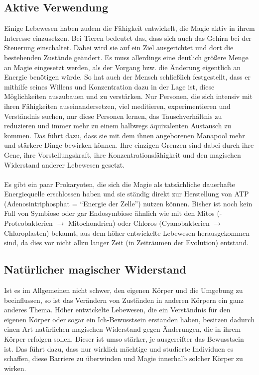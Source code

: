 \subsection{Aktive Verwendung}
Einige Lebewesen haben zudem die Fähigkeit entwickelt, die Magie aktiv in ihrem Interesse einzusetzen.
Bei Tieren bedeutet das, dass sich auch das Gehirn bei der Steuerung einschaltet.
Dabei wird sie auf ein Ziel ausgerichtet und dort die bestehenden Zustände geändert.
Es muss allerdings eine deutlich größere Menge an Magie eingesetzt werden, als der Vorgang bzw. die Änderung eigentlich an Energie benötigen würde.
So hat auch der Mensch schließlich festgestellt, dass er mithilfe seines Willens und Konzentration dazu in der Lage ist, diese Möglichkeiten auszubauen und zu verstärken.
Nur Personen, die sich intensiv mit ihren Fähigkeiten auseinandersetzen, viel meditieren, experimentieren und Verständnis suchen, nur diese Personen lernen, das Tauschverhältnis zu reduzieren und immer mehr zu einem halbwegs äquivalenten Austausch zu kommen.
Das führt dazu, dass sie mit dem ihnen angeborenen Manapool mehr und stärkere Dinge bewirken können.
Ihre einzigen Grenzen sind dabei durch ihre Gene, ihre Vorstellungskraft, ihre Konzentrationsfähigkeit und den magischen Widerstand anderer Lebewesen gesetzt. 
\\ \\
Es gibt ein paar Prokaryoten, die sich die Magie als tatsächliche dauerhafte Energiequelle erschlossen haben und sie ständig direkt zur Herstellung von ATP (Adenosintriphosphat = "`Energie der Zelle"') nutzen können.
Bisher ist noch kein Fall von Symbiose oder gar Endosymbiose ähnlich wie mit den Mitos (\textalpha-Proteobakterien $\rightarrow$ Mitochondrien) oder Chloros (Cyanobakterien $\rightarrow$ Chloroplasten) bekannt, aus dem höher entwickelte Lebewesen herausgekommen sind, da dies vor nicht allzu langer Zeit (in Zeiträumen der Evolution) entstand.


\subsection{Natürlicher magischer Widerstand}
Ist es im Allgemeinen nicht schwer, den eigenen Körper und die Umgebung zu beeinflussen, so ist das Verändern von Zuständen in anderen Körpern ein ganz anderes Thema.
Höher entwickelte Lebewesen, die ein Verständnis für den eigenen Körper oder sogar ein Ich-Bewusstsein erstanden haben, besitzen dadurch einen Art natürlichen magischen Widerstand gegen Änderungen, die in ihrem Körper erfolgen sollen. 
Dieser ist umso stärker, je ausgereifter das Bewusstsein ist.
Das führt dazu, dass nur wirklich mächtige und studierte Individuen es schaffen, diese Barriere zu überwinden und Magie innerhalb solcher Körper zu wirken.



